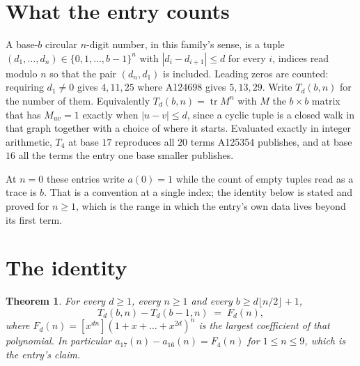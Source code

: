 \documentclass[11pt,a4paper]{article}
\theoremstyle{plain}
\newtheorem{theorem}{Theorem}
\theoremstyle{definition}
\begin{document}
\section{What the entry counts}

A base-$b$ circular $n$-digit number, in this family's sense, is a tuple
$(d_1,\dots,d_n)\in\{0,1,\dots,b-1\}^{n}$ with $|d_i-d_{i+1}|\le d$ for every $i$, indices
read modulo $n$ so that the pair $(d_n,d_1)$ is included. Leading zeros are counted: requiring
$d_1\ne0$ gives $4,11,25$ where A124698 gives $5,13,29$. Write $T_d(b,n)$ for the number of
them. Equivalently $T_d(b,n)=\operatorname{tr}M^{n}$ with $M$ the $b\times b$ matrix that has
$M_{uv}=1$ exactly when $|u-v|\le d$, since a cyclic tuple is a closed walk in that graph
together with a choice of where it starts. Evaluated exactly in integer arithmetic, $T_{4}$
at base $17$ reproduces all $20$ terms A125354 publishes, and at base $16$ all the
terms the entry one base smaller publishes.

At $n=0$ these entries write $a(0)=1$ while the count of empty tuples read as a trace is $b$.
That is a convention at a single index; the identity below is stated and proved for $n\ge1$,
which is the range in which the entry's own data lives beyond its first term.

\section{The identity}

\begin{theorem}
For every $d\ge1$, every $n\ge1$ and every $b\ge d\lfloor n/2\rfloor+1$,
\[
T_d(b,n)-T_d(b-1,n)\;=\;F_d(n),
\]
where $F_d(n)=[x^{dn}](1+x+\dots+x^{2d})^{n}$ is the largest coefficient of that
polynomial. In particular $a_{17}(n)-a_{16}(n)=F_{4}(n)$ for $1\le n\le9$, which
is the entry's claim.
\end{theorem}
\end{document}
